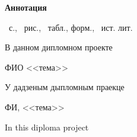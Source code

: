 \begin{center}
    \bf{Аннотация}
\end{center}

\totalpages\ с., \totalfigures\ рис.,  \totaltables\ табл., \totalequation форм., \totalbibs\ ист. лит.
\newline

В данном дипломном проекте 
\newline

ФИО <<тема>>

У дадзеным дыпломным праекце 
\newline

ФИ, <<тема>>

In this diploma project
